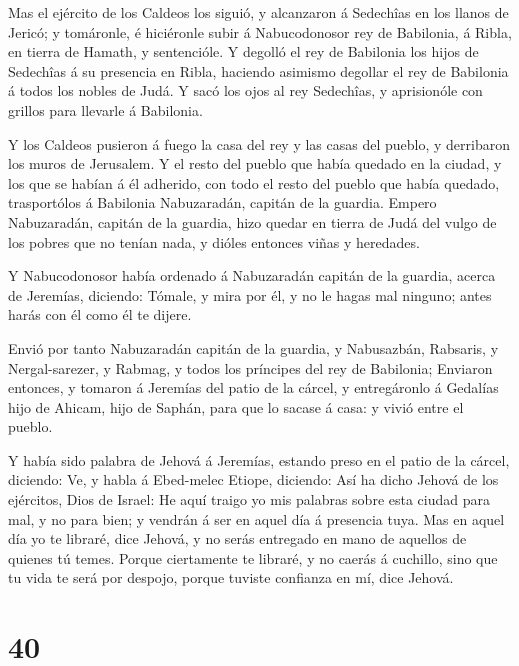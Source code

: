  Mas el ejército de los Caldeos los siguió, y alcanzaron á
Sedechîas en los llanos de Jericó; y tomáronle, é hiciéronle subir á
Nabucodonosor rey de Babilonia, á Ribla, en tierra de Hamath, y
sentencióle.  Y degolló el rey de Babilonia los hijos de
Sedechîas á su presencia en Ribla, haciendo asimismo degollar el rey de
Babilonia á todos los nobles de Judá.  Y sacó los ojos al
rey Sedechîas, y aprisionóle con grillos para llevarle á Babilonia.

 Y los Caldeos pusieron á fuego la casa del rey y las casas
del pueblo, y derribaron los muros de Jerusalem.  Y el resto
del pueblo que había quedado en la ciudad, y los que se habían á él
adherido, con todo el resto del pueblo que había quedado, trasportólos á
Babilonia Nabuzaradán, capitán de la guardia.  Empero
Nabuzaradán, capitán de la guardia, hizo quedar en tierra de Judá del
vulgo de los pobres que no tenían nada, y dióles entonces viñas y
heredades.

 Y Nabucodonosor había ordenado á Nabuzaradán capitán de la
guardia, acerca de Jeremías, diciendo:  Tómale, y mira por
él, y no le hagas mal ninguno; antes harás con él como él te dijere.

 Envió por tanto Nabuzaradán capitán de la guardia, y
Nabusazbán, Rabsaris, y Nergal-sarezer, y Rabmag, y todos los príncipes
del rey de Babilonia;  Enviaron entonces, y tomaron á
Jeremías del patio de la cárcel, y entregáronlo á Gedalías hijo de
Ahicam, hijo de Saphán, para que lo sacase á casa: y vivió entre el
pueblo.

 Y había sido palabra de Jehová á Jeremías, estando preso
en el patio de la cárcel, diciendo:  Ve, y habla á
Ebed-melec Etiope, diciendo: Así ha dicho Jehová de los ejércitos, Dios
de Israel: He aquí traigo yo mis palabras sobre esta ciudad para mal, y
no para bien; y vendrán á ser en aquel día á presencia tuya.
 Mas en aquel día yo te libraré, dice Jehová, y no serás
entregado en mano de aquellos de quienes tú temes.  Porque
ciertamente te libraré, y no caerás á cuchillo, sino que tu vida te será
por despojo, porque tuviste confianza en mí, dice Jehová.

\hypertarget{section-39}{%
\section{40}\label{section-39}}

